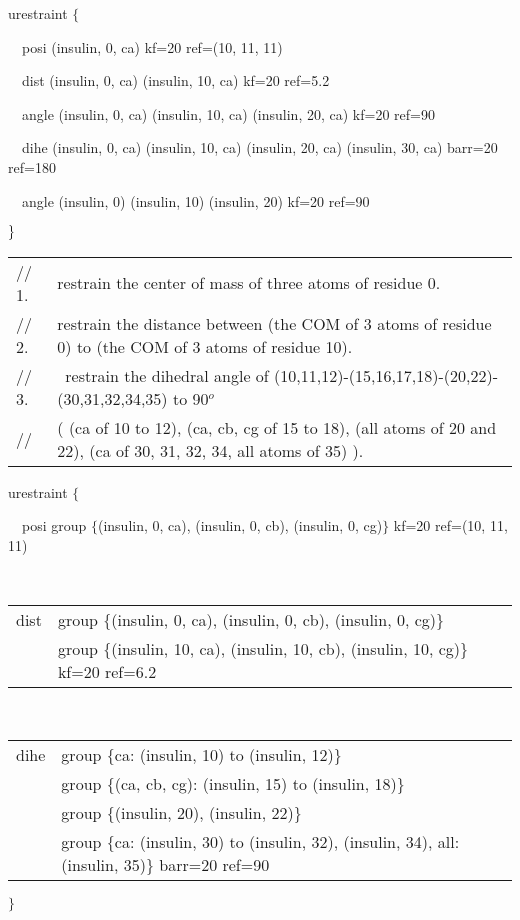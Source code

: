 urestraint $\{$

~~posi (insulin, 0, ca) kf=20 ref=(10, 11, 11)

~~dist (insulin, 0, ca) (insulin, 10, ca) kf=20 ref=5.2

~~angle (insulin, 0, ca) (insulin, 10, ca) (insulin, 20, ca) kf=20 ref=90

~~dihe (insulin, 0, ca) (insulin, 10, ca) (insulin, 20, ca) (insulin, 30,
ca) barr=20 ref=180

~~angle (insulin, 0) (insulin, 10) (insulin, 20) kf=20 ref=90

$\}\bigskip $

\begin{tabular}{ll}
{\footnotesize // 1. } & {\footnotesize restrain the center of mass of three
atoms of residue 0.} \\ 
{\footnotesize // 2.} & {\footnotesize restrain the distance between (the
COM of 3 atoms of residue 0) to  (the COM of 3 atoms of residue 10).} \\ 
{\footnotesize // 3.} & {\footnotesize \ restrain the dihedral angle of
(10,11,12)-(15,16,17,18)-(20,22)-(30,31,32,34,35) to 90}$^{o}$ \\ 
{\footnotesize //} & {\footnotesize ( (ca of 10 to 12), (ca, cb, cg of 15 to
18), (all atoms of 20 and 22), (ca of 30, 31, 32, 34, all atoms of 35) ).}
\end{tabular}

urestraint $\{$

~~posi group $\{$(insulin, 0, ca), (insulin, 0, cb), (insulin, 0, cg)$\}$
kf=20 ref=(10, 11, 11)

~~
\begin{tabular}{ll}
dist & group $\{$(insulin, 0, ca), (insulin, 0, cb), (insulin, 0, cg)$\}$ \\ 
& group $\{$(insulin, 10, ca), (insulin, 10, cb), (insulin, 10, cg)$\}$
kf=20 ref=6.2
\end{tabular}

~~
\begin{tabular}{ll}
dihe & group $\{$ca: (insulin, 10) to (insulin, 12)$\}$ \\ 
& group $\{$(ca, cb, cg): (insulin, 15) to (insulin, 18)$\}$ \\ 
& group $\{$(insulin, 20), (insulin, 22)$\}$ \\ 
& group $\{$ca: (insulin, 30) to (insulin, 32), (insulin, 34), all:
(insulin, 35)$\}$ barr=20 ref=90
\end{tabular}

$\}$

